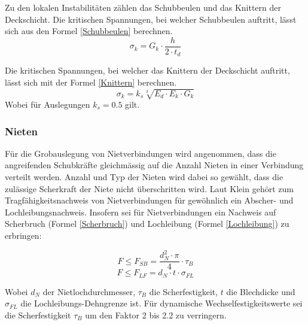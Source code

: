     Zu den lokalen Instabilitäten zählen das Schubbeulen und das Knittern der Deckschicht. Die kritischen Spannungen, bei welcher Schubbeulen auftritt, lässt sich aus den Formel \ref{Schubbeulen} berechnen. \cite{ETH}
    \begin{equation}
      \label{Schubbeulen}
      \sigma_k = G_k \cdot \frac{h}{2 \cdot t_d}
    \end{equation}

    Die kritischen Spannungen, bei welcher das Knittern der Deckschicht auftritt, lässt sich mit der Formel \ref{Knittern} berechnen. \cite{ETH}
    \begin{equation}
      \label{Knittern}
      \sigma_k = k_s\sqrt[3]{E_d \cdot E_k \cdot G_k}
    \end{equation}
    Wobei für Auslegungen \(k_s = 0.5\) gilt.

\newpage
  \subsubsection{Nieten}
    Für die Grobauslegung von Nietverbindungen wird angenommen, dass die angreifenden Schubkräfte gleichmässig auf die Anzahl Nieten in einer Verbindung verteilt werden. Anzahl und Typ der Nieten wird dabei so gewählt, dass die zulässige Scherkraft der Niete nicht überschritten wird. Laut Klein \cite{klein} gehört zum Tragfähigkeitsnachweis von Nietverbindungen für gewöhnlich ein Abscher- und Lochleibungsnachweis. Insofern sei für Nietverbindungen ein Nachweis auf Scherbruch (Formel \ref{Scherbruch}) und Lochleibung (Formel \ref{Lochleibung}) zu erbringen:
    \begin{multicols}{2}
      \begin{equation}
        \label{Scherbruch}
        F \leq F_{SB} = \frac{d_N^2 \cdot \pi}{4}\cdot \tau_B
      \end{equation}\break
      \begin{equation}
        \label{Lochleibung}
        F \leq F_{LF} = d_N \cdot t \cdot \sigma_{FL}
      \end{equation}
    \end{multicols}
    Wobei $d_N$ der Nietlochdurchmesser, $\tau_B$ die Scherfestigkeit, $t$ die Blechdicke und $\sigma_{FL}$ die Lochleibungs-Dehngrenze ist. Für dynamische Wechselfestigkeitswerte sei die Scherfestigkeit $\tau_B$ um den Faktor 2 bis 2.2 zu verringern.


